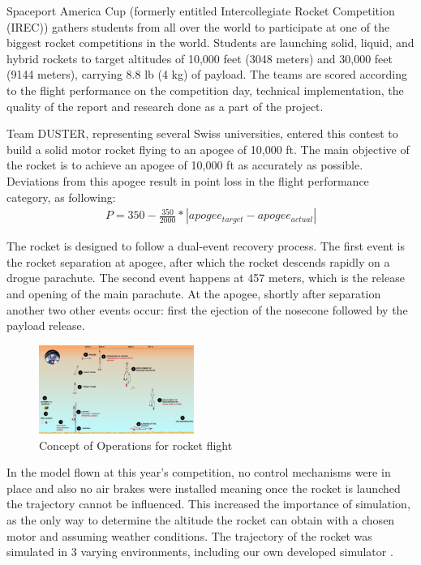 \documentclass[]{iac}
\begin{document}
Spaceport America Cup (formerly entitled Intercollegiate Rocket Competition (IREC)) gathers students from all over the world to participate at one of the biggest rocket competitions in the world. Students are launching solid, liquid, and hybrid rockets to target altitudes of 10,000 feet (3048 meters) and 30,000 feet (9144 meters), carrying 8.8 lb (4 kg) of payload. The teams are scored according to the flight performance on the competition day, technical implementation, the quality of the report and research done as a part of the project.

Team DUSTER, representing several Swiss universities, entered this contest to build a solid motor rocket flying to an apogee of 10,000 ft.
The main objective of the rocket is to achieve an apogee of 10,000 ft as accurately as possible. Deviations from this apogee result in point loss in the flight performance\cite{spaceport} category, as following:
\begin{align}
P = 350 - \frac{350}{2000}*|apogee_{target} - apogee_{actual}|
\end{align}

The rocket is designed to follow a dual-event recovery process. The first event is the rocket separation at apogee, after which the rocket descends rapidly on a drogue parachute. The second event happens at 457 meters, which is the release and opening of the main parachute.
At the apogee, shortly after separation another two other events occur: first the ejection of the nosecone followed by the payload release.

  \begin{figure}[h!]
    \centering
        \includegraphics[width=0.45\textwidth]{img/conops.jpg}
        \caption{Concept of Operations for rocket flight}
        \label{f:conops}
 \end{figure}

In the model flown at this year's competition, no control mechanisms were in place and also no air brakes were installed meaning once the rocket is launched the trajectory cannot be influenced. This increased the importance of simulation, as the only way to determine the altitude the rocket can obtain with a chosen motor and assuming  weather conditions.  The trajectory of the rocket was simulated in 3 varying environments, including our own developed simulator  \cite{sim_hassan}.
\end{document}
